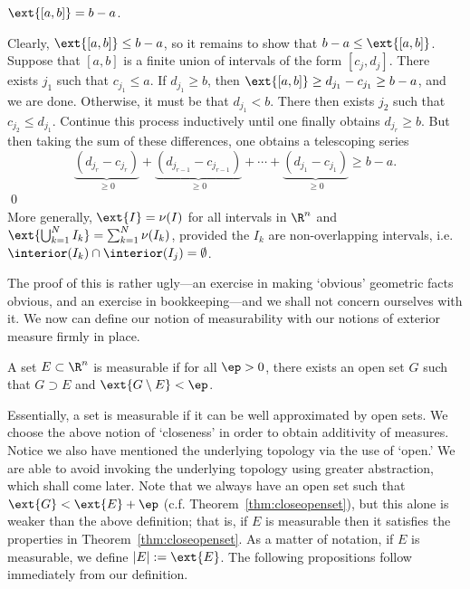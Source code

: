 \begin{prop}
$\ext{[a,b]}= b-a$. 
\end{prop}

\pf Clearly, $\ext{[a,b]} \leq b-a$, so it remains to show that $b-a \leq \ext{[a,b]}$. Suppose that $[a,b]$ is a finite union of intervals of the form $[c_j,d_j]$. There exists $j_1$ such that $c_{j_1} \leq a$. If $d_{j_1} \geq b$, then $\ext{[a,b]} \geq d_{j_1} - c_{j_1} \geq b-a$, and we are done. Otherwise, it must be that $d_{j_1} < b$. There then exists $j_2$ such that $c_{j_2} \leq d_{j_1}$. Continue this process inductively until one finally obtains $d_{j_r} \geq b$. But then taking the sum of these differences, one obtains a telescoping series
	\[
	\underbrace{(d_{j_{r}} - c_{j_{r}})}_{\geq 0} + \underbrace{(d_{j_{r-1}} - c_{j_{r-1}})}_{\geq 0} + \cdots + \underbrace{(d_{j_{1}} - c_{j_{1}})}_{\geq 0} \geq b-a.
	\]
\qed \\


More generally, $\ext{I} = \nu(I)$ for all intervals in $\R^n$ and $\ext{\bigcup_{k=1}^N I_k}= \sum_{k=1}^N \nu(I_k)$, provided the $I_k$ are non-overlapping intervals, i.e. $\interior(I_k) \cap \interior(I_j)= \emptyset$. 




\noindent The proof of this is rather ugly---an exercise in making `obvious' geometric facts obvious, and an exercise in bookkeeping---and we shall not concern ourselves with it. We now can define our notion of measurability with our notions of exterior measure firmly in place. 


\begin{dfn}[Measurable]
A set $E \subset \R^n$ is measurable if for all $\ep>0$, there exists an open set $G$ such that $G \supset E$ and $\ext{G \setminus E} < \ep$.
\end{dfn}

Essentially, a set is measurable if it can be well approximated by open sets. We choose the above notion of `closeness' in order to obtain additivity of measures. Notice we also have mentioned the underlying topology via the use of `open.' We are able to avoid invoking the underlying topology using greater abstraction, which shall come later. Note that we always have an open set such that $\ext{G} < \ext{E}+\ep$ (c.f. Theorem~\ref{thm:closeopenset}), but this alone is weaker than the above definition; that is, if $E$ is measurable then it satisfies the properties in Theorem~\ref{thm:closeopenset}. As a matter of notation, if $E$ is measurable, we define $|E|:= \ext{E}$. The following propositions follow immediately from our definition.

